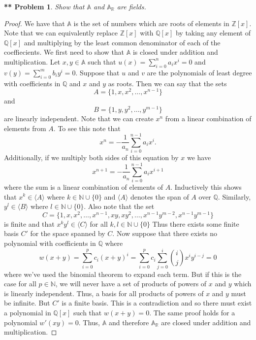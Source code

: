 \documentclass{article}
\newtheorem{**}{** Problem}
\begin{document}
\begin{flushleft}
\begin{**}
Show that $\mathbb{A}$ and $\mathbb{A}_{\mathbb{R}}$ are fields.
\end{**}
\begin{proof}
We have that $\mathbb{A}$ is the set of numbers which are roots of elements in $\mathbb{Z}[x]$. Note that we can equivalently replace $\mathbb{Z}[x]$ with $\mathbb{Q}[x]$ by taking any element of $\mathbb{Q}[x]$ and multiplying by the least common denominator of each of the coeffiecients. We first need to show that $\mathbb{A}$ is closed under addition and multiplication. Let $x, y \in \mathbb{A}$ such that $u(x) = \sum_{i=0}^{n} a_ix^i = 0$ and $v(y) = \sum_{i=0}^{m} b_i y^i = 0$. Suppose that $u$ and $v$ are the polynomials of least degree with coefficients in $\mathbb{Q}$ and $x$ and $y$ as roots. Then we can say that the sets
\[
A = \{1, x, x^2, \dots , x^{n-1}\}
\]
and
\[
B = \{1, y, y^2, \dots , y^{m-1}\}
\]
are linearly independent. Note that we can create $x^n$ from a linear combination of elements from $A$. To see this note that
\[
x^n = -\frac{1}{a_n} \sum_{i=0}^{n-1} a_i x^i.
\]
Additionally, if we multiply both sides of this equation by $x$ we have
\[
x^{n+1} = -\frac{1}{a_n} \sum_{i=0}^{n-1} a_i x^{i+1}
\]
where the sum is a linear combination of elements of $A$. Inductively this shows that $x^k \in \langle A \rangle$ where $k \in \mathbb{N} \cup \{0\}$ and $\langle A \rangle$ denotes the span of $A$ over $\mathbb{Q}$. Similarly, $y^l \in \langle B \rangle$ where $l \in \mathbb{N} \cup \{0\}$. Also note that the set
\[
C = \{1, x, x^2, \dots , x^{n-1}, xy, xy^2, \dots , x^{n-1}y^{m-2}, x^{n-1}y^{m-1}\}
\]
is finite and that $x^ky^l \in \langle C \rangle$ for all $k, l \in \mathbb{N} \cup \{0\}$ Thus there exists some finite basis $C'$ for the space spanned by $C$. Now suppose that there exists no polynomial with coefficients in $\mathbb{Q}$ where
\[
w(x+y) = \sum_{i=0}^{p} c_i (x+y)^i = \sum_{i=0}^{p} c_i \sum_{j=0}^{i} \binom{i}{j} x^i y^{i-j} = 0
\]
where we've used the binomial theorem to expand each term. But if this is the case for all $p \in \mathbb{N}$, we will never have a set of products of powers of $x$ and $y$ which is linearly independent. Thus, a basis for all products of powers of $x$ and $y$ must be infinite. But $C'$ is a finite basis. This is a contradiction and so there must exist a polynomial in $\mathbb{Q}[x]$ such that $w(x+y) = 0$. The same proof holds for a polynomial $w'(xy) = 0$. Thus, $\mathbb{A}$ and therefore $\mathbb{A}_{\mathbb{R}}$ are closed under addition and multiplication.\newline


\end{proof}
\end{flushleft}
\end{document}
